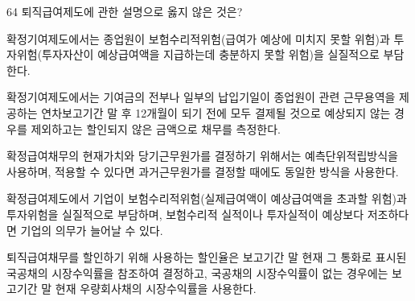 \begin{question}{64}
퇴직급여제도에 관한 설명으로 옳지 않은 것은?
\begin{choices}
  \item 확정기여제도에서는 종업원이 보험수리적위험(급여가 예상에 미치지 못할 위험)과 투자위험(투자자산이 예상급여액을 지급하는데 충분하지 못할 위험)을 실질적으로 부담한다.
  \item 확정기여제도에서는 기여금의 전부나 일부의 납입기일이 종업원이 관련 근무용역을 제공하는 연차보고기간 말 후 12개월이 되기 전에 모두 결제될 것으로 예상되지 않는 경우를 제외하고는 할인되지 않은 금액으로 채무를 측정한다.
  \item 확정급여채무의 현재가치와 당기근무원가를 결정하기 위해서는 예측단위적립방식을 사용하며, 적용할 수 있다면 과거근무원가를 결정할 때에도 동일한 방식을 사용한다.
  \item 확정급여제도에서 기업이 보험수리적위험(실제급여액이 예상급여액을 초과할 위험)과 투자위험을 실질적으로 부담하며, 보험수리적 실적이나 투자실적이 예상보다 저조하다면 기업의 의무가 늘어날 수 있다.
  \item 퇴직급여채무를 할인하기 위해 사용하는 할인율은 보고기간 말 현재 그 통화로 표시된 국공채의 시장수익률을 참조하여 결정하고, 국공채의 시장수익률이 없는 경우에는 보고기간 말 현재 우량회사채의 시장수익률을 사용한다.
\end{choices}
\end{question}
